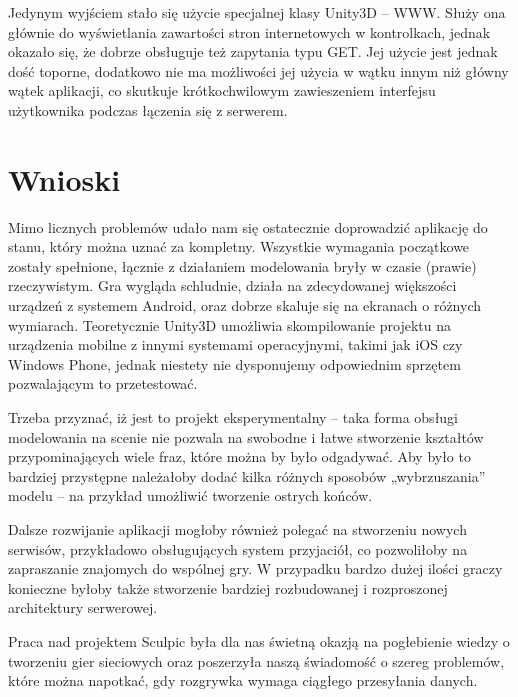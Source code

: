 Jedynym wyjściem stało się użycie specjalnej klasy Unity3D – WWW. Służy ona głównie do wyświetlania zawartości stron internetowych w kontrolkach, jednak okazało się, że dobrze obsługuje też zapytania typu GET. Jej użycie jest jednak dość toporne, dodatkowo nie ma możliwości jej użycia w wątku innym niż główny wątek aplikacji, co skutkuje krótkochwilowym zawieszeniem interfejsu użytkownika podczas łączenia się z serwerem. 

\section{Wnioski}
Mimo licznych problemów udało nam się ostatecznie doprowadzić aplikację do stanu, który można uznać za kompletny. Wszystkie wymagania początkowe zostały spełnione, łącznie z działaniem modelowania bryły w czasie (prawie) rzeczywistym. Gra wygląda schludnie, działa na zdecydowanej większości urządzeń z systemem Android, oraz dobrze skaluje się na ekranach o różnych wymiarach. Teoretycznie Unity3D umożliwia skompilowanie projektu na urządzenia mobilne z innymi systemami operacyjnymi, takimi jak iOS czy Windows Phone, jednak niestety nie dysponujemy odpowiednim sprzętem pozwalającym to przetestować.

Trzeba przyznać, iż jest to projekt eksperymentalny – taka forma obsługi modelowania na scenie nie pozwala na swobodne i łatwe stworzenie kształtów przypominających wiele fraz, które można by było odgadywać. Aby było to bardziej przystępne należałoby dodać kilka różnych sposobów „wybrzuszania” modelu – na przykład umożliwić tworzenie ostrych końców.

Dalsze rozwijanie aplikacji mogłoby również polegać na stworzeniu nowych serwisów, przykładowo obsługujących system przyjaciół, co pozwoliłoby na zapraszanie znajomych do wspólnej gry. W przypadku bardzo dużej ilości graczy konieczne byłoby także stworzenie bardziej rozbudowanej i rozproszonej architektury serwerowej.

Praca nad projektem Sculpic była dla nas świetną okazją na pogłebienie wiedzy o tworzeniu gier sieciowych oraz poszerzyła naszą świadomość o szereg problemów, które można napotkać, gdy rozgrywka wymaga ciągłego przesyłania danych.
